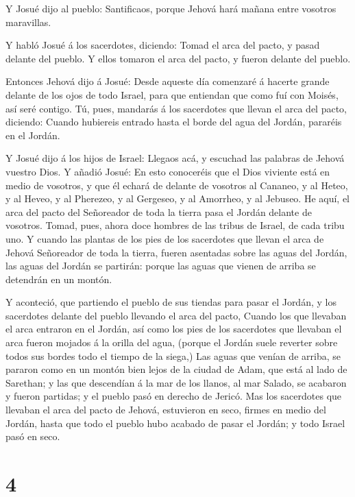  Y Josué dijo al pueblo: Santificaos, porque Jehová hará
mañana entre vosotros maravillas.

 Y habló Josué á los sacerdotes, diciendo: Tomad el arca del
pacto, y pasad delante del pueblo. Y ellos tomaron el arca del pacto, y
fueron delante del pueblo.

 Entonces Jehová dijo á Josué: Desde aqueste día comenzaré á
hacerte grande delante de los ojos de todo Israel, para que entiendan
que como fuí con Moisés, así seré contigo.  Tú, pues,
mandarás á los sacerdotes que llevan el arca del pacto, diciendo: Cuando
hubiereis entrado hasta el borde del agua del Jordán, pararéis en el
Jordán.

 Y Josué dijo á los hijos de Israel: Llegaos acá, y escuchad
las palabras de Jehová vuestro Dios.  Y añadió Josué: En
esto conoceréis que el Dios viviente está en medio de vosotros, y que él
echará de delante de vosotros al Cananeo, y al Heteo, y al Heveo, y al
Pherezeo, y al Gergeseo, y al Amorrheo, y al Jebuseo.  He
aquí, el arca del pacto del Señoreador de toda la tierra pasa el Jordán
delante de vosotros.  Tomad, pues, ahora doce hombres de
las tribus de Israel, de cada tribu uno.  Y cuando las
plantas de los pies de los sacerdotes que llevan el arca de Jehová
Señoreador de toda la tierra, fueren asentadas sobre las aguas del
Jordán, las aguas del Jordán se partirán: porque las aguas que vienen de
arriba se detendrán en un montón.

 Y aconteció, que partiendo el pueblo de sus tiendas para
pasar el Jordán, y los sacerdotes delante del pueblo llevando el arca
del pacto,  Cuando los que llevaban el arca entraron en el
Jordán, así como los pies de los sacerdotes que llevaban el arca fueron
mojados á la orilla del agua, (porque el Jordán suele reverter sobre
todos sus bordes todo el tiempo de la siega,)  Las aguas
que venían de arriba, se pararon como en un montón bien lejos de la
ciudad de Adam, que está al lado de Sarethan; y las que descendían á la
mar de los llanos, al mar Salado, se acabaron y fueron partidas; y el
pueblo pasó en derecho de Jericó.  Mas los sacerdotes que
llevaban el arca del pacto de Jehová, estuvieron en seco, firmes en
medio del Jordán, hasta que todo el pueblo hubo acabado de pasar el
Jordán; y todo Israel pasó en seco.

\hypertarget{section-3}{%
\section{4}\label{section-3}}

